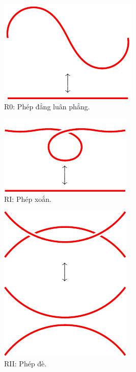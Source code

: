 \documentclass[12pt]{article}
\begin{document}
\begin{figure}[h!]
    \begin{minipage}{0.48\textwidth}
        \centering
        \includegraphics{R0.pdf} \\
        R0: Phép đẳng luân phẳng.     \vspace{1cm}
    \end{minipage}
    \begin{minipage}{0.48\textwidth}
        \centering
        \includegraphics{R1.pdf} \\
        RI: Phép xoắn.
        \vspace{1cm}
    \end{minipage}
    \begin{minipage}{0.48\textwidth}
        \centering
        \includegraphics{R2.pdf} \\
        RII: Phép đè.
    \end{minipage}
    \begin{minipage}{0.48\textwidth}

\end{minipage}
\end{figure}
\end{document}
